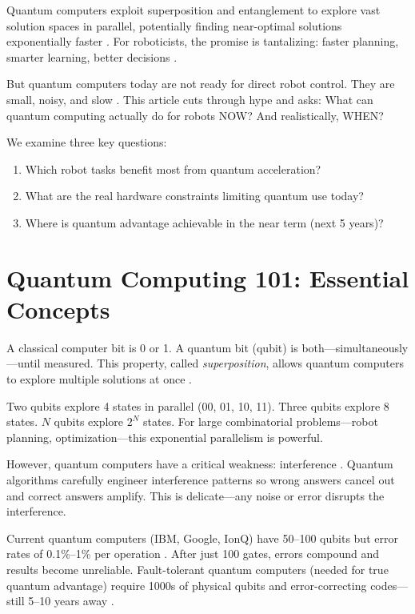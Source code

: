\documentclass[journal]{IEEEtran}
\begin{document}
Quantum computers exploit superposition and entanglement to explore vast solution spaces in parallel, potentially finding near-optimal solutions exponentially faster \cite{b4, b5}. For roboticists, the promise is tantalizing: faster planning, smarter learning, better decisions \cite{b6, b7, b8}.

But quantum computers today are not ready for direct robot control. They are small, noisy, and slow \cite{b9, b10}. This article cuts through hype and asks: What can quantum computing actually do for robots NOW? And realistically, WHEN?

We examine three key questions:

\begin{enumerate}
\item Which robot tasks benefit most from quantum acceleration?
\item What are the real hardware constraints limiting quantum use today?
\item Where is quantum advantage achievable in the near term (next 5 years)?
\end{enumerate}

\section{Quantum Computing 101: Essential Concepts}

A classical computer bit is 0 or 1. A quantum bit (qubit) is both---simultaneously---until measured. This property, called \textit{superposition}, allows quantum computers to explore multiple solutions at once \cite{b4, b5}.

Two qubits explore 4 states in parallel (00, 01, 10, 11). Three qubits explore 8 states. $N$ qubits explore $2^N$ states. For large combinatorial problems---robot planning, optimization---this exponential parallelism is powerful.

However, quantum computers have a critical weakness: interference \cite{b4}. Quantum algorithms carefully engineer interference patterns so wrong answers cancel out and correct answers amplify. This is delicate---any noise or error disrupts the interference.

Current quantum computers (IBM, Google, IonQ) have 50--100 qubits but error rates of 0.1\%--1\% per operation \cite{b9, b10, b11}. After just 100 gates, errors compound and results become unreliable. Fault-tolerant quantum computers (needed for true quantum advantage) require 1000s of physical qubits and error-correcting codes---still 5--10 years away \cite{b13, b14}.
\end{document}
